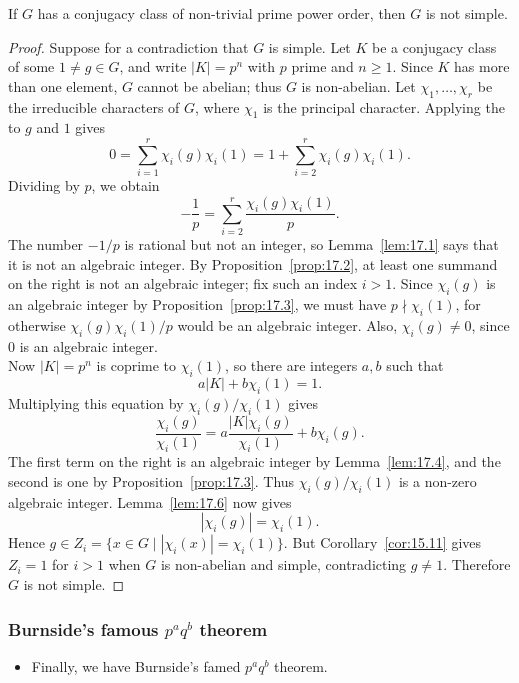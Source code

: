 \documentclass[../Odyssey_Project.tex]{subfiles}
\begin{document}
\begin{theorem}
\label{thm:17.7}
If $G$ has a conjugacy class of non-trivial prime power order, then $G$ is not simple.
\end{theorem}
\begin{proof}
    Suppose for a contradiction that $G$ is simple. Let $K$ be a conjugacy class of some $1\neq g\in G$, and write $|K|=p^n$ with $p$ prime and $n\geq1$. Since $K$ has more than one element, $G$ cannot be abelian; thus $G$ is non-abelian. Let $\chi_1,\ldots,\chi_r$ be the irreducible characters of $G$, where $\chi_1$ is the principal character. Applying the  to $g$ and $1$ gives
    \[
        0=\sum_{i=1}^{r}\chi_i(g)\chi_i(1)
        =1+\sum_{i=2}^{r}\chi_i(g)\chi_i(1).
    \]
    Dividing by $p$, we obtain
    \[
        -\frac{1}{p}=\sum_{i=2}^{r}\frac{\chi_i(g)\chi_i(1)}{p}.
    \]
    The number $-1/p$ is rational but not an integer, so Lemma~\ref{lem:17.1} says that it is not an algebraic integer. By Proposition~\ref{prop:17.2}, at least one summand on the right is not an algebraic integer; fix such an index $i>1$. Since $\chi_i(g)$ is an algebraic integer by Proposition~\ref{prop:17.3}, we must have $p\nmid\chi_i(1)$, for otherwise $\chi_i(g)\chi_i(1)/p$ would be an algebraic integer. Also, $\chi_i(g)\neq0$, since $0$ is an algebraic integer.\\
    Now $|K|=p^n$ is coprime to $\chi_i(1)$, so there are integers $a,b$ such that
    \[
        a|K|+b\chi_i(1)=1.
    \]
    Multiplying this equation by $\chi_i(g)/\chi_i(1)$ gives
    \[
        \frac{\chi_i(g)}{\chi_i(1)}
        =a\frac{|K|\chi_i(g)}{\chi_i(1)}+b\chi_i(g).
    \]
    The first term on the right is an algebraic integer by Lemma~\ref{lem:17.4}, and the second is one by Proposition~\ref{prop:17.3}. Thus $\chi_i(g)/\chi_i(1)$ is a non-zero algebraic integer. Lemma~\ref{lem:17.6} now gives
    \[
        |\chi_i(g)|=\chi_i(1).
    \]
    Hence $g\in Z_i=\{x\in G\mid |\chi_i(x)|=\chi_i(1)\}$. But Corollary~\ref{cor:15.11} gives $Z_i=1$ for $i>1$ when $G$ is non-abelian and simple, contradicting $g\neq1$. Therefore $G$ is not simple.
\end{proof}

\subsubsection*{Burnside's famous \texorpdfstring{$p^a q^b$}{p\^a q\^b} theorem}
\begin{itemize}
    \item Finally, we have Burnside's famed $p^a q^b$ theorem.
\end{itemize}
\end{document}
